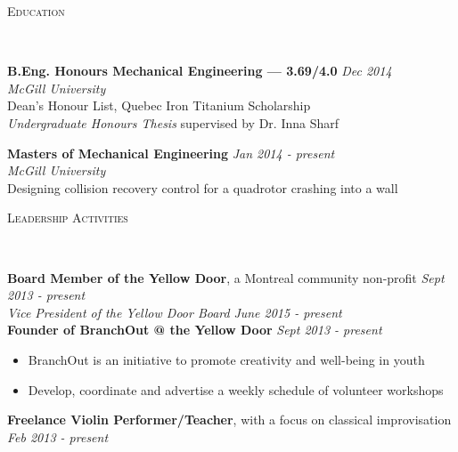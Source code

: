 \documentclass[9pt]{article}
\newenvironment{changemargin}[2]{%
  \begin{list}{}{%
    \setlength{\topsep}{0pt}%
    \setlength{\leftmargin}{#1}%
    \setlength{\rightmargin}{#2}%
    \setlength{\listparindent}{\parindent}%
    \setlength{\itemindent}{\parindent}%
    \setlength{\parsep}{\parskip}%
  }%
  \item[]}{\end{list}
}
\newcommand{\lineover}{
	\begin{changemargin}{-0.05in}{-0.05in}
		\vspace*{-8pt}
		\hrulefill \\
		\vspace*{-2pt}
	\end{changemargin}
}
\newcommand{\header}[1]{
	\begin{changemargin}{-0.5in}{-0.5in}
		\scshape{#1}\\
  	\lineover
	\end{changemargin}
}
\newenvironment{body} {
	\vspace*{-16pt}
	\begin{changemargin}{-0.25in}{-0.5in}
  }	
	{\end{changemargin}
}
\begin{document}
\bigskip

\header{Education}

\begin{body}
	\vspace{14pt}
	\textbf{B.Eng. Honours Mechanical Engineering --- 3.69/4.0} \hfill \emph{Dec 2014} \\
	\emph{McGill University}\\
	\emph \quad Dean's Honour List, Quebec Iron Titanium Scholarship\\
	\emph {Undergraduate Honours Thesis} supervised by Dr. Inna Sharf\\
\end{body}
\medskip
\begin{body}
	\vspace{14pt}
	\textbf{Masters of Mechanical Engineering} \hfill \emph{Jan 2014 - present} \\
	\emph{McGill University}\\
	\emph \quad Designing collision recovery control for a quadrotor crashing into a wall\\

\end{body}

\bigskip
\header{Leadership Activities}

\begin{body}
	\vspace{14pt}
	\textbf{Board Member of the Yellow Door}, a Montreal community non-profit \hfill {} \emph{Sept 2013 - present}\\
	\smallskip
	\emph{Vice President of the Yellow Door Board} \hfill {} \emph{June 2015 - present}\\
	\medskip
	\textbf{Founder of BranchOut @ the Yellow Door} \hfill {} \emph{Sept 2013 - present}\\
	\medskip
	\begin{itemize} \itemsep -0pt  %

		\item 	BranchOut is an initiative to promote creativity and well-being in youth 
		\item Develop, coordinate and advertise a weekly schedule of volunteer workshops 
    \end{itemize}
	
    \medskip
	\textbf{Freelance Violin Performer/Teacher}, with a focus on classical improvisation \hfill {} \emph{Feb 2013 - present}\\

\end{body}

\smallskip
\end{document}
